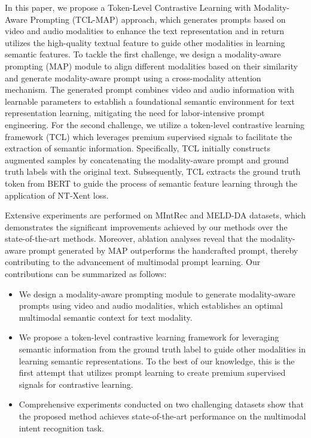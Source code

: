 \documentclass[letterpaper]{article} %
\begin{document}
In this paper, we propose a Token-Level Contrastive Learning with Modality-Aware Prompting (TCL-MAP) approach, which generates prompts based on video and audio modalities to enhance the text representation and in return utilizes the high-quality textual feature to guide other modalities in learning semantic features. To tackle the first challenge, we design a modality-aware prompting (MAP) module to align different modalities based on their similarity and generate modality-aware prompt using a cross-modality attention mechanism. The generated prompt combines video and audio information with learnable parameters to establish a foundational semantic environment for text representation learning, mitigating the need for labor-intensive prompt engineering. For the second challenge, we utilize a token-level contrastive learning framework (TCL) which leverages premium supervised signals to facilitate the extraction of semantic information. Specifically, TCL initially constructs augmented samples by concatenating the modality-aware prompt and ground truth labels with the original text. Subsequently, TCL extracts the ground truth token from BERT \cite{devlin2018bert} to guide the process of semantic feature learning through the application of NT-Xent \cite{sohn2016improved} loss.


Extensive experiments are performed on MIntRec \cite{10.1145/3503161.3547906} and MELD-DA \cite{saha-etal-2020-towards} datasets, which demonstrates the significant improvements achieved by our methods over the state-of-the-art methods. Moreover, ablation analyses reveal that the modality-aware prompt generated by MAP outperforms the handcrafted prompt, thereby contributing to the advancement of multimodal prompt learning. Our contributions can be summarized as follows:

\begin{itemize}
    \item We design a modality-aware prompting module to generate modality-aware prompts using video and audio modalities, which establishes an optimal multimodal semantic context for text modality.

    \item We propose a token-level contrastive learning framework for leveraging semantic information from the ground truth label to guide other modalities in learning semantic representations. To the best of our knowledge, this is the first attempt that utilizes prompt learning to create premium supervised signals for contrastive learning.

    \item Comprehensive experiments conducted on two challenging datasets show that the proposed method achieves state-of-the-art performance on the multimodal intent recognition task.
\end{itemize}
\end{document}
